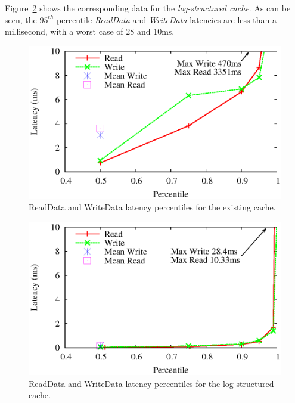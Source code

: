 \documentclass{sig-alternate}
\begin{document}
Figure~\ref{fig:flash-perf} shows the corresponding data for the
\emph{log-structured cache}.  As can be seen, the $95^{th}$ percentile
\emph{ReadData} and \emph{WriteData} latencies are less than a millisecond, with
a worst case of 28 and 10ms.

\begin{figure}[t]
  \begin{center}
    \includegraphics[width=1.04\columnwidth]{graphs/disk-perf}
  \end{center}
  \caption{ReadData and WriteData latency percentiles for the existing cache.}
  \label{fig:disk-perf} 
\vspace{-0.2in}
\end{figure}

\begin{figure}[t]
  \begin{center}
    \includegraphics[width=1.04\columnwidth]{graphs/flash-perf}
  \end{center}
  \caption{ReadData and WriteData latency percentiles for the log-structured
    cache.}
  \label{fig:flash-perf} 
\vspace{-0.2in}
\end{figure}
\end{document}
